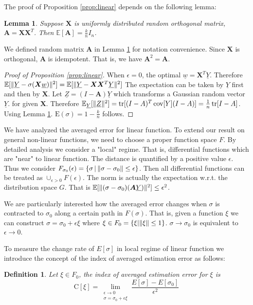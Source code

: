 \documentclass[conference,letterpaper]{IEEEtran}
\newtheorem{definition}{Definition}
\newtheorem{lemma}{Lemma}
\DeclarePairedDelimiter\norm{\lVert}{\rVert}
\def\E{\mathbb{E}}
\DeclareMathOperator*{\Tr}{tr}
\DeclareMathOperator*{\Cov}{cov}
\begin{document}
The proof of Proposition \ref{prop:linear} depends on the following lemma:
\begin{lemma}\label{lem:A}
Suppose $\bm{X}$ is uniformly distributed random orthogonal matrix, $\bm{A} = \bm{X}\bm{X}^T$.
Then $\E[\bm{A}] = \frac{k}{n} I_n$.
\end{lemma}
We defined random matrix $\bm{A}$ in Lemma \ref{lem:A} for notation convenience.
Since $\bm{X}$ is orthogonal, $\bm{A}$ is idempotent. That is, we have $\bm{A}^2 = \bm{A}$.

\begin{proof}[Proof of Proposition \ref{prop:linear}]
When $\epsilon = 0$, the optimal $\underline{w} = \bm{X}^T\underline{Y}$. Therefore
$\E[\norm{\underline{Y} - \sigma(\bm{X} \underline{w})}^2] = \E[\norm{\underline{Y}-\bm{X}\bm{X}^T\underline{Y}}^2]$
The expectation can be taken by $\underline{Y}$ first and then by $\bm{X}$.
Let $\underline{Z} = (I-\bm{A}) \underline{Y}$ which transforms a Gaussian random vector $\underline{Y}$.
for given $\bm{X}$. Therefore $\E_{\underline{Y}}[\norm{\underline{Z}}^2] = \Tr[(I-A)^T\Cov[Y](I-A)]
= \frac{1}{n}\Tr[I - A]$. Using Lemma \ref{lem:A}. $\mathrm{E}(\sigma) = 1 - \frac{k}{n}$ follows.
\end{proof}

We have analyzed the averaged error for linear function. To extend our result on general non-linear functions, we need to choose a proper function space $F$. By detailed analysis we consider a "local" regime. That is, differential functions which are "near" to linear function. The distance is quantified by a positive value $\epsilon$. Thus we consider $F_{\sigma_0}(\epsilon) =\{ \sigma \,|\, \norm{\sigma - \sigma_0} \leq \epsilon\}$. Then all differential functions can be treated as $\cup_{\epsilon>0} F(\epsilon)$. The norm is actually the expectation w.r.t. the distribution space $G$. That is $\E[\norm{(\sigma - \sigma_0)(\bm{A}\underline{Y})}^2] \leq \epsilon^2$.

We are particularly interested how the averaged error changes when $\sigma$ is contracted to $\sigma_0$ along a certain path in $F(\sigma)$. That is, given a function $\xi$ we can construct $\sigma = \sigma_0 + \epsilon \xi$ where $\xi \in F_0 = \{\xi | \norm{\xi} \leq 1 \}$. $\sigma \to \sigma_0$ is equivalent to $\epsilon \to 0$.

To measure the change rate of $E[\sigma]$ in local regime of linear function we introduce the concept of the index of averaged estimation error as follows:
\begin{definition}
Let $\xi \in F_0$, the index of averaged estimation error for $\xi$ is
\begin{equation}
\mathrm{C}[\xi] = \lim_{\substack{\epsilon \to 0 \\ \sigma = \sigma_0 + \epsilon \xi}} \frac{E[\sigma] - E[\sigma_0]}{\epsilon^2}
\end{equation}
\end{definition}
\end{document}
